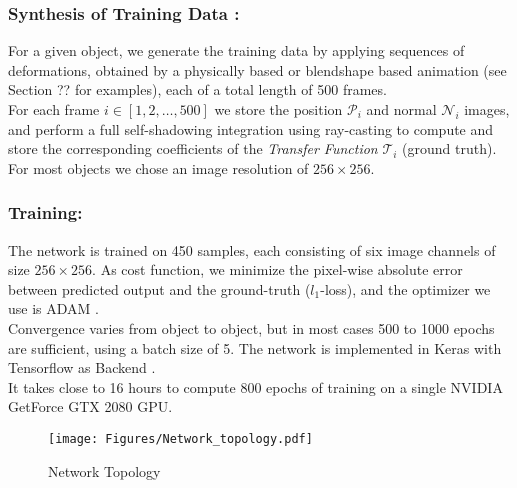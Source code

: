 \subsubsection*{Synthesis of Training Data :\\}
For a given object, we generate the training data by applying sequences of  deformations, obtained by a physically based or blendshape based animation (see Section ?? for examples), each of a total length of 500 frames. 
\\
For each frame $i \in [1,2,\dots,500]$ we store the position $\mathcal{P}_i$  and normal $\mathcal{N}_i$ images, and perform a full self-shadowing integration using ray-casting to compute and store the corresponding coefficients of the \textit{Transfer Function} $\mathcal{T}_i$ (ground truth).
\\
For most objects we chose an image resolution of $256 \times 256$. 

\subsubsection*{Training: \\} 
The network is trained on 450 samples, each consisting of six image channels of size $256 \times 256$. As cost function, we minimize the pixel-wise absolute error between predicted output and the ground-truth ($l_1$-loss), and the optimizer we use is ADAM \cite{ADAM}. 
\\
Convergence varies from object to object, but in most cases 500 to 1000 epochs are sufficient, using a batch size of 5. The network is implemented in Keras with Tensorflow as Backend \cite{Keras}. 
\\
It takes close to 16 hours to compute 800 epochs of training on a single NVIDIA GetForce GTX 2080 GPU.
\begin{figure*}[t]
  \centering
    \texttt{[image: Figures/Network\_topology.pdf]}
     \caption{Network Topology}
     \label{Fig: NetworkTopology}
\end{figure*}

  


